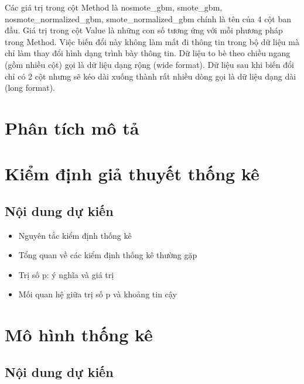 \documentclass[]{tufte-book}
\providecommand{\tightlist}{%
  \setlength{\itemsep}{0pt}\setlength{\parskip}{0pt}}
\begin{document}
Các giá trị trong cột Method là nosmote\_gbm, smote\_gbm, nosmote\_normalized\_gbm, smote\_normalized\_gbm chính là tên của 4 cột ban đầu. Giá trị trong cột Value là những con số tương ứng với mỗi phương pháp trong Method. Việc biến đổi này không làm mất đi thông tin trong bộ dữ liệu mà chỉ làm thay đổi hình dạng trình bày thông tin. Dữ liệu to bè theo chiều ngang (gồm nhiều cột) gọi là dữ liệu dạng rộng (wide format). Dữ liệu sau khi biến đổi chỉ có 2 cột nhưng sẽ kéo dài xuống thành rất nhiều dòng gọi là dữ liệu dạng dài (long format).

\hypertarget{phan-tich-mo-ta}{%
\chapter{Phân tích mô tả}\label{phan-tich-mo-ta}}

\hypertarget{kim-inh-gia-thuyt-thng-ke}{%
\chapter{Kiểm định giả thuyết thống kê}\label{kim-inh-gia-thuyt-thng-ke}}

\hypertarget{ni-dung-d-kin-1}{%
\section{Nội dung dự kiến}\label{ni-dung-d-kin-1}}

\begin{itemize}
\tightlist
\item
  Nguyên tắc kiểm định thống kê
\item
  Tổng quan về các kiểm định thống kê thường gặp
\item
  Trị số p: ý nghĩa và giá trị
\item
  Mối quan hệ giữa trị số p và khoảng tin cậy
\end{itemize}

\hypertarget{mo-hinh-thng-ke}{%
\chapter{Mô hình thống kê}\label{mo-hinh-thng-ke}}

\hypertarget{ni-dung-d-kin-2}{%
\section{Nội dung dự kiến}\label{ni-dung-d-kin-2}}
\end{document}
